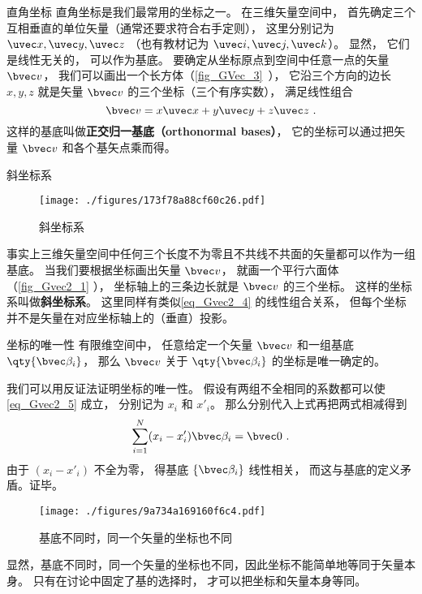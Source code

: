 \begin{example}{直角坐标}
直角坐标是我们最常用的坐标之一。 在三维矢量空间中， 首先确定三个互相垂直的单位矢量（通常还要求符合右手定则）， 这里分别记为 $\uvec x, \uvec y, \uvec z$ （也有教材记为 $\uvec i, \uvec j, \uvec k$）。 显然， 它们是线性无关的， 可以作为基底。 要确定从坐标原点到空间中任意一点的矢量 $\bvec v$， 我们可以画出一个长方体（\autoref{fig_GVec_3}~）， 它沿三个方向的边长 $x, y, z$ 就是矢量 $\bvec v$ 的三个坐标（三个有序实数）， 满足线性组合
\begin{equation}\label{eq_Gvec2_4}
\bvec v = x\uvec x + y\uvec y + z\uvec z~.
\end{equation}
这样的基底叫做\textbf{正交归一基底（orthonormal bases）}， 它的坐标可以通过把矢量 $\bvec v$ 和各个基矢点乘而得。
\end{example}

\begin{example}{斜坐标系}\label{ex_Gvec2_1}
\begin{figure}[ht]
\centering
\texttt{[image: ./figures/173f78a88cf60c26.pdf]}
\caption{斜坐标系} \label{fig_Gvec2_1}
\end{figure}
事实上三维矢量空间中任何三个长度不为零且不共线不共面的矢量都可以作为一组基底。 当我们要根据坐标画出矢量 $\bvec v$， 就画一个平行六面体（\autoref{fig_Gvec2_1} ）， 坐标轴上的三条边长就是 $\bvec v$ 的三个坐标。 这样的坐标系叫做\textbf{斜坐标系}。 这里同样有类似\autoref{eq_Gvec2_4} 的线性组合关系， 但每个坐标并不是矢量在对应坐标轴上的（垂直）投影。
\end{example}

\begin{theorem}{坐标的唯一性}
有限维空间中， 任意给定一个矢量 $\bvec v$ 和一组基底 $\qty{\bvec \beta_i}$， 那么 $\bvec v$ 关于 $\qty{\bvec \beta_i}$ 的坐标是唯一确定的。
\end{theorem}
我们可以用反证法证明坐标的唯一性。 假设有两组不全相同的系数都可以使\autoref{eq_Gvec2_5} 成立， 分别记为 $x_i$ 和 $x'_i$。 那么分别代入上式再把两式相减得到
\begin{equation}
\sum_{i=1}^N (x_i-x'_i) \bvec \beta_i = \bvec 0~.
\end{equation}
由于 $(x_i-x'_i)$ 不全为零， 得基底 $\{\bvec \beta_i\}$ 线性相关， 而这与基底的定义矛盾。证毕。
\begin{figure}[ht]
\centering
\texttt{[image: ./figures/9a734a169160f6c4.pdf]}
\caption{基底不同时，同一个矢量的坐标也不同} \label{fig_Gvec2_2}
\end{figure}
显然，基底不同时，同一个矢量的坐标也不同，因此坐标不能简单地等同于矢量本身。 只有在讨论中固定了基的选择时， 才可以把坐标和矢量本身等同。

